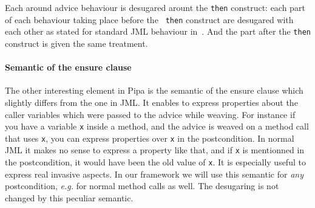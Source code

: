 Each around advice behaviour is desugared arount the {\tt then}
construct: each part of each behaviour taking place before the {\tt
then} construct are desugared with each other as stated for standard
JML behaviour in~\cite{clifton02spectators}.  And the part after the
{\tt then} construct is given the same treatment.

\paragraph{Semantic of the ensure clause}
The other interesting element in Pipa is the semantic of the ensure
clause which slightly differs from the one in JML. It enables to
express properties about the caller variables which were passed to the
advice while weaving. For instance if you have a variable {\tt x}
inside a method, and the advice is weaved on a method call that uses
{\tt x}, you can express properties over {\tt x} in the
postcondition. In normal JML it makes no sense to express a property
like that, and if {\tt x} is mentionned in the postcondition, it would
have been the old value of {\tt x}. It is especially useful to express
real invasive aspects. In our framework we will use this semantic for
{\it any} postcondition, {\it e.g.}  for normal method calls as well.
The desugaring is not changed by this peculiar semantic.
